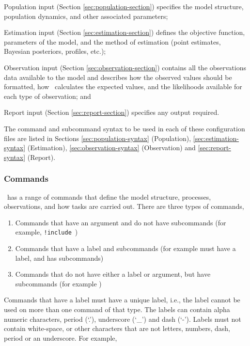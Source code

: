 \begin{description}

\item Population input (Section \ref{sec:population-section}) specifies the model structure, population dynamics, and other associated parameters;
\item Estimation input (Section \ref{sec:estimation-section}) defines the objective function, parameters of the model, and the method of estimation (point estimates, Bayesian posteriors, profiles, etc.);
\item Observation input (Section \ref{sec:observation-section}) contains all the observations data available to the model and  describes how the observed values should be formatted, how \CNAME\ calculates the expected values, and the likelihoods available for each type of observation; and
\item Report input (Section \ref{sec:report-section}) specifies any output required.
\end{description}

The command and subcommand syntax to be used in each of these configuration files are listed in Sections \ref{sec:population-syntax} (Population), \ref{sec:estimation-syntax} (Estimation), \ref{sec:observation-syntax} (Observation) and \ref{sec:report-syntax} (Report).

\subsubsection{Commands}

\CNAME\ has a range of commands that define the model structure, processes, observations, and how tasks are carried out. There are three types of commands,

\begin{enumerate}
\item Commands that have an argument and do not have subcommands (for example, \texttt{!include}\ )
\item Commands that have a label and subcommands (for example  must have a label, and has subcommands)
\item Commands that do not have either a label or argument, but have subcommands (for example )
\end{enumerate}

Commands that have a label must have a unique label, i.e., the label cannot be used on more than one command of that type. The labels can contain alpha numeric characters, period (`.'), underscore (`\_') and dash (`-'). Labels must not contain white-space, or other characters that are not letters, numbers, dash, period or an underscore. For example,

